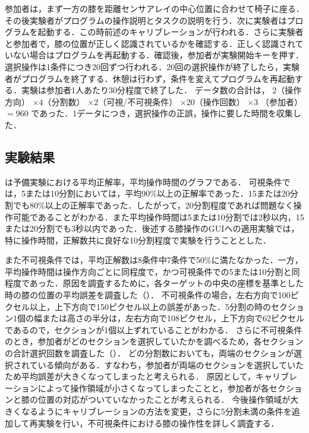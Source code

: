 \documentclass[submit, techrep]{ipsj}
\begin{document}
\par
参加者は，まず一方の膝を距離センサアレイの中心位置に合わせて椅子に座る．その後実験者がプログラムの操作説明とタスクの説明を行う．次に実験者はプログラムを起動する．この時前述のキャリブレーションが行われる．さらに実験者と参加者で，膝の位置が正しく認識されているかを確認する．正しく認識されていない場合はプログラムを再起動する．確認後，参加者が実験開始キーを押す．選択操作は1条件につき20回ずつ行われる．20回の選択操作が終了したら，実験者がプログラムを終了する．休憩は行わず，条件を変えてプログラムを再起動する．実験は参加者1人あたり30分程度で終了した．
データ数の合計は，
$2$（操作方向） $\times 4$（分割数） $\times 2$（可視/不可視条件） $\times 20$（操作回数） $\times 3$ （参加者） $= 960$
であった．1データにつき，選択操作の正誤，操作に要した時間を収集した．

\subsection{実験結果}
は予備実験における平均正解率，平均操作時間のグラフである．
可視条件では，5または10分割においては，平均90\%以上の正解率であった．15または20分割でも80\%以上の正解率であった．したがって，20分割程度であれば問題なく操作可能であることがわかる．また平均操作時間は5または10分割では2秒以内，15または20分割でも3秒以内であった．後述する膝操作のGUIへの適用実験では，特に操作時間，正解数共に良好な10分割程度で実験を行うこととした．
\par
また不可視条件では，平均正解数は8条件中7条件で50\%に満たなかった．一方，平均操作時間は操作方向ごとに同程度で，かつ可視条件での5または10分割と同程度であった．原因を調査するために，各ターゲットの中央の座標を基準とした時の膝の位置の平均誤差を調査した（）．
不可視条件の場合，左右方向で100ピクセル以上，上下方向で150ピクセル以上の誤差があった．5分割の時のセクション1個の幅または高さの半分は，左右方向で108ピクセル，上下方向で62ピクセルであるので，セクションが1個以上ずれていることがわかる．
さらに不可視条件のとき，参加者がどのセクションを選択していたかを調べるため，各セクションの合計選択回数を調査した（）．
どの分割数においても，両端のセクションが選択されている傾向がある．すなわち，参加者が両端のセクションを選択していたため平均誤差が大きくなってしまったと考えられる．
原因として，キャリブレーションによって操作領域が小さくなってしまったことと，参加者が各セクションと膝の位置の対応がついていなかったことが考えられる．
今後操作領域が大きくなるようにキャリブレーションの方法を変更，さらに5分割未満の条件を追加して再実験を行い，不可視条件における膝の操作性を詳しく調査する．
\end{document}
